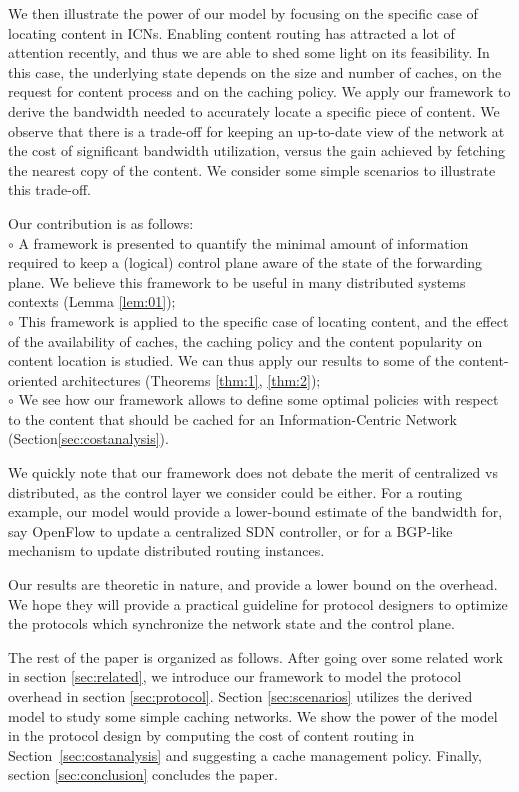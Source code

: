 \documentclass[conference]{IEEEtran}
\theoremstyle{plain}
\theoremstyle{remark}
\begin{document}
We then illustrate the power of our model by focusing on the specific case of locating content in ICNs. Enabling content routing has attracted a lot of attention recently, and thus we are able to shed some light on its feasibility.  In this case, the underlying state depends on the size and number of caches, on the request for content process and on the caching policy. We  apply our framework to derive the bandwidth needed to accurately locate a specific piece of content. We observe that there is a  trade-off for keeping an up-to-date view of the network at the cost of  significant  bandwidth utilization, versus the gain achieved by fetching the nearest copy of the content. We consider some simple scenarios to illustrate this trade-off.

Our contribution is as follows:\\
$\circ$ A framework is presented to quantify the minimal amount of information required to keep a (logical) control plane aware of the state of the forwarding plane. We believe this framework to be useful in many distributed systems contexts (Lemma \ref{lem:01});\\
$\circ$ This framework is applied to the specific case of locating content, and the effect of the availability of caches, the caching policy and the content popularity on content location is studied. We can thus apply our results to some of the content-oriented architectures (Theorems \ref{thm:1}, \ref{thm:2});\\
$\circ$ We see how our framework allows to define some optimal policies with respect to the content that should be cached for an Information-Centric Network (Section\ref{sec:costanalysis}).

We quickly note that our framework does not debate the merit of centralized vs distributed, as the control layer we consider could be either. For a routing example, our model would provide a lower-bound estimate of the bandwidth for, say OpenFlow to update a centralized SDN controller, or for a BGP-like mechanism to update distributed routing instances.

Our results are theoretic in nature, and provide a lower bound on the overhead. We hope they will provide a practical guideline for protocol designers to optimize the protocols which synchronize the network state and the control plane.

The rest of the paper is organized as follows. After going over some related work in section \ref{sec:related}, we  introduce our framework to model the protocol overhead in section \ref{sec:protocol}. Section \ref{sec:scenarios} utilizes the derived model to study some simple caching networks. We show the power of the model in the protocol design by computing the cost of content routing in Section~\ref{sec:costanalysis} and suggesting a cache management policy. Finally, section \ref{sec:conclusion} concludes the paper.
\end{document}
